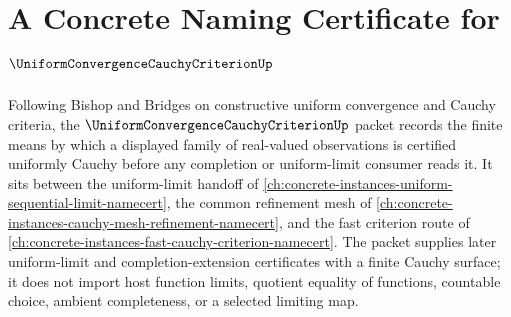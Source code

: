 \chapter{A Concrete Naming Certificate for $\UniformConvergenceCauchyCriterionUp$}
\label{ch:concrete-instances-uniform-convergence-cauchy-criterion-namecert}

Following Bishop and Bridges on constructive uniform convergence and Cauchy criteria, the $\UniformConvergenceCauchyCriterionUp$ packet records the finite means by which a displayed family of real-valued observations is certified uniformly Cauchy before any completion or uniform-limit consumer reads it. It sits between the uniform-limit handoff of \autoref{ch:concrete-instances-uniform-sequential-limit-namecert}, the common refinement mesh of \autoref{ch:concrete-instances-cauchy-mesh-refinement-namecert}, and the fast criterion route of \autoref{ch:concrete-instances-fast-cauchy-criterion-namecert}. The packet supplies later uniform-limit and completion-extension certificates with a finite Cauchy surface; it does not import host function limits, quotient equality of functions, countable choice, ambient completeness, or a selected limiting map.

